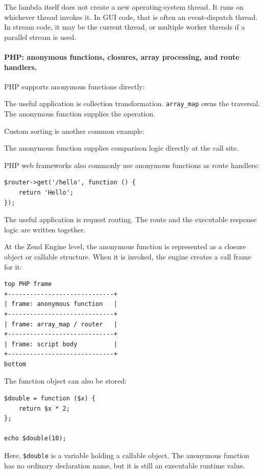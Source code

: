 The lambda itself does not create a new operating-system thread. It runs on whichever thread invokes it. In GUI code, that is often an event-dispatch thread. In stream code, it may be the current thread, or multiple worker threads if a parallel stream is used.

\paragraph{PHP: anonymous functions, closures, array processing, and route handlers.}

PHP supports anonymous functions directly:

The useful application is collection transformation. \texttt{array\_map} owns the traversal. The anonymous function supplies the operation.

Custom sorting is another common example:

The anonymous function supplies comparison logic directly at the call site.

PHP web frameworks also commonly use anonymous functions as route handlers:

\begin{verbatim}
$router->get('/hello', function () {
    return 'Hello';
});
\end{verbatim}

The useful application is request routing. The route and the executable response logic are written together.

At the Zend Engine level, the anonymous function is represented as a closure object or callable structure. When it is invoked, the engine creates a call frame for it:

\begin{verbatim}
top PHP frame
+-----------------------------+
| frame: anonymous function   |
+-----------------------------+
| frame: array_map / router   |
+-----------------------------+
| frame: script body          |
+-----------------------------+
bottom
\end{verbatim}

The function object can also be stored:

\begin{verbatim}
$double = function ($x) {
    return $x * 2;
};

echo $double(10);
\end{verbatim}

Here, \texttt{\$double} is a variable holding a callable object. The anonymous function has no ordinary declaration name, but it is still an executable runtime value.

